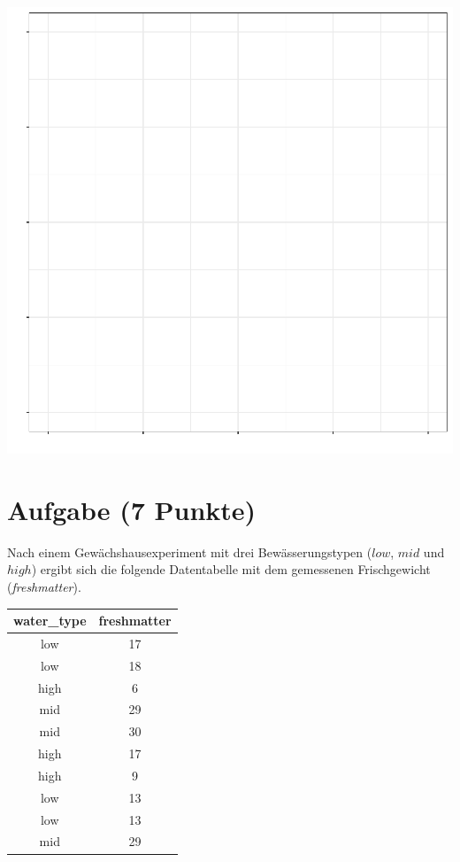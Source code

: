 \documentclass[a4paper, 10pt]{scrartcl}\usepackage[]{graphicx}\usepackage[]{xcolor}
\makeatletter
\def\maxwidth{ %
  \ifdim\Gin@nat@width>\linewidth
    \linewidth
  \else
    \Gin@nat@width
  \fi
}
\makeatother
\begin{document}
{\centering \includegraphics[width=\maxwidth]{img/desc-01-1} 

}


 
\clearpage

\section{Aufgabe \hfill (7 Punkte)}

Nach einem Gew{\"a}chshausexperiment mit drei Bew{\"a}sserungstypen ($low$, $mid$
und $high$) ergibt sich die folgende Datentabelle mit dem gemessenen
Frischgewicht (\textit{freshmatter}).

\begin{table}[!h]
\centering
\begin{tabular}{cc}
\toprule
water\_type & freshmatter\\
\midrule
low & 17\\
low & 18\\
high & 6\\
mid & 29\\
mid & 30\\
\addlinespace
high & 17\\
high & 9\\
low & 13\\
low & 13\\
mid & 29\\
\bottomrule
\end{tabular}
\end{table}
\end{document}
